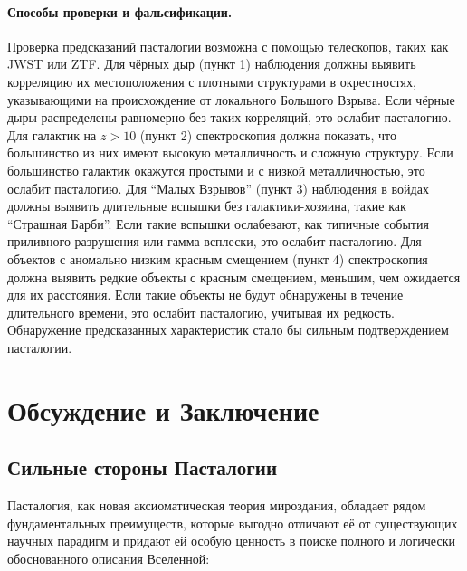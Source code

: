 \documentclass[pdflatex,sn-mathphys-num,referee]{sn-jnl}
\begin{document}
\paragraph{Способы проверки и фальсификации.} Проверка предсказаний пасталогии возможна с помощью телескопов, таких как JWST или ZTF. Для чёрных дыр (пункт 1) наблюдения должны выявить корреляцию их местоположения с плотными структурами в окрестностях, указывающими на происхождение от локального Большого Взрыва. Если чёрные дыры распределены равномерно без таких корреляций, это ослабит пасталогию. Для галактик на \( z > 10 \) (пункт 2) спектроскопия должна показать, что большинство из них имеют высокую металличность и сложную структуру. Если большинство галактик окажутся простыми и с низкой металличностью, это ослабит пасталогию. Для ``Малых Взрывов'' (пункт 3) наблюдения в войдах должны выявить длительные вспышки без галактики-хозяина, такие как ``Страшная Барби''. Если такие вспышки ослабевают, как типичные события приливного разрушения или гамма-всплески, это ослабит пасталогию. Для объектов с аномально низким красным смещением (пункт 4) спектроскопия должна выявить редкие объекты с красным смещением, меньшим, чем ожидается для их расстояния. Если такие объекты не будут обнаружены в течение длительного времени, это ослабит пасталогию, учитывая их редкость. Обнаружение предсказанных характеристик стало бы сильным подтверждением пасталогии.

\section{Обсуждение и Заключение}\label{sec:discussion-conclusion}

\subsection{Сильные стороны Пасталогии}\label{subsec:strengths}

Пасталогия, как новая аксиоматическая теория мироздания, обладает рядом фундаментальных преимуществ, которые выгодно отличают её от существующих научных парадигм и придают ей особую ценность в поиске полного и логически обоснованного описания Вселенной:
\end{document}
